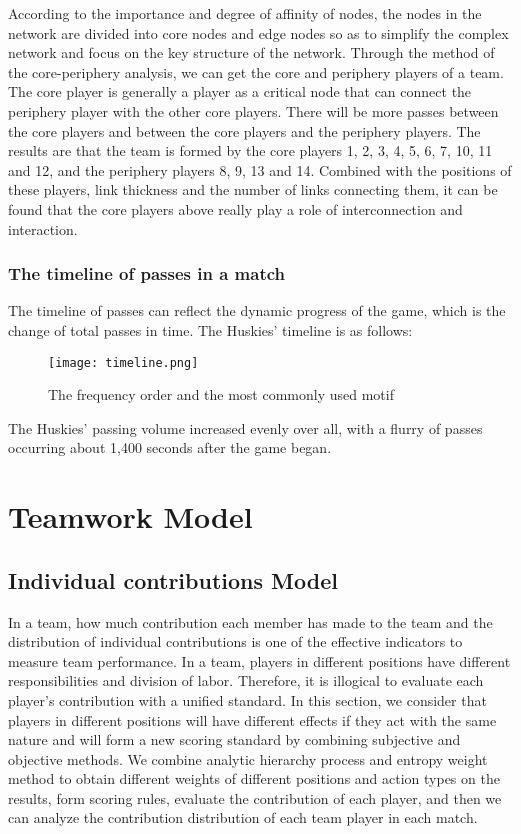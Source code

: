 \documentclass{mcmthesis}
\begin{document}
According to the importance and degree of affinity of nodes, the nodes in the network are
divided into core nodes and edge nodes so as to simplify the complex network and focus on
the key structure of the network. Through the method of the core-periphery analysis, we can
get the core and periphery players of a team. The core player is generally a player as a critical
node that can connect the periphery player with the other core players. There will be more
passes between the core players and between the core players and the periphery players.
The results are that the team is formed by the core players 1, 2, 3, 4, 5, 6, 7, 10, 11 and 12,
and the periphery players 8, 9, 13 and 14. Combined with the positions of these players, link
thickness and the number of links connecting them, it can be found that the core players
above really play a role of interconnection and interaction.

\subsubsection{The timeline of passes in a match}
The timeline of passes can reflect the dynamic progress of the game, which is the change of
total passes in time. The Huskies' timeline is as follows:

\begin{figure}
        \centering
        \texttt{[image: timeline.png]}
        \caption{The frequency order and the most commonly used motif}
\end{figure}

The Huskies' passing volume increased evenly over all, with a flurry of passes occurring about
1,400 seconds after the game began.

\section{Teamwork Model}
\subsection{Individual contributions Model}
In a team, how much contribution each member has made to the team and the
distribution of individual contributions is one of the effective indicators to measure
team performance. In a team, players in different positions have different
responsibilities and division of labor. Therefore, it is illogical to evaluate each player's
contribution with a unified standard. In this section, we consider that players in
different positions will have different effects if they act with the same nature and will
form a new scoring standard by combining subjective and objective methods. We
combine analytic hierarchy process and entropy weight method to obtain different
weights of different positions and action types on the results, form scoring rules,
evaluate the contribution of each player, and then we can analyze the contribution
distribution of each team player in each match.
\end{document}
